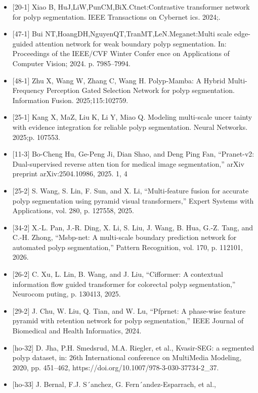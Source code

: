 \begin{itemize}
\item
  {[}20-1{]} Xiao B, HuJ,LiW,PunCM,BiX.Ctnet:Contrastive transformer
  network for polyp segmentation. IEEE Transactions on Cybernet ics.
  2024;.
\item
  {[}47-1{]} Bui NT,HoangDH,NguyenQT,TranMT,LeN.Meganet:Multi scale
  edge-guided attention network for weak boundary polyp segmentation.
  In: Proceedings of the IEEE/CVF Winter Confer ence on Applications of
  Computer Vision; 2024. p. 7985--7994.
\item
  {[}48-1{]} Zhu X, Wang W, Zhang C, Wang H. Polyp-Mamba: A Hybrid
  Multi-Frequency Perception Gated Selection Network for polyp
  segmentation. Information Fusion. 2025;115:102759.
\item
  {[}25-1{]} Kang X, MaZ, Liu K, Li Y, Miao Q. Modeling multi-scale
  uncer tainty with evidence integration for reliable polyp
  segmentation. Neural Networks. 2025;p. 107553.
\item
  {[}11-3{]} Bo-Cheng Hu, Ge-Peng Ji, Dian Shao, and Deng Ping Fan,
  ``Pranet-v2: Dual-supervised reverse atten tion for medical image
  segmentation,'' arXiv preprint arXiv:2504.10986, 2025. 1, 4
\item
  {[}25-2{]} S. Wang, S. Lin, F. Sun, and X. Li, ``Multi-feature fusion
  for accurate polyp segmentation using pyramid visual transformers,''
  Expert Systems with Applications, vol. 280, p. 127558, 2025.
\item
  {[}34-2{]} X.-L. Pan, J.-R. Ding, X. Li, S. Liu, J. Wang, B. Hua,
  G.-Z. Tang, and C.-H. Zhong, ``Msbp-net: A multi-scale boundary
  prediction network for automated polyp segmentation,'' Pattern
  Recognition, vol. 170, p. 112101, 2026.
\item
  {[}26-2{]} C. Xu, L. Lin, B. Wang, and J. Liu, ``Cifformer: A
  contextual information flow guided transformer for colorectal polyp
  segmentation,'' Neurocom puting, p. 130413, 2025.
\item
  {[}29-2{]} J. Chu, W. Liu, Q. Tian, and W. Lu, ``Pfprnet: A phase-wise
  feature pyramid with retention network for polyp segmentation,'' IEEE
  Journal of Biomedical and Health Informatics, 2024.
\item
  {[}ho-32{]} D. Jha, P.H. Smedsrud, M.A. Riegler, et al., Kvasir-SEG: a
  segmented polyp dataset, in: 26th International conference on
  MultiMedia Modeling, 2020, pp. 451--462,
  https://doi.org/10.1007/978-3-030-37734-2\_37.
\item
  {[}ho-33{]} J. Bernal, F.J. S´anchez, G. Fern´andez-Esparrach, et al.,

\end{itemize}
